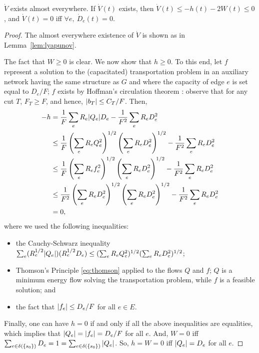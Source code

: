 \documentclass[11pt,a4paper]{article}
\begin{document}
\begin{lemma}
\label{lem:lyapunov transportation}
$\dot{V}$ exists almost everywhere. 
If $\dot{V}(t)$ exists, then $\dot{V}(t) \le -h(t) -2W(t) \le 0$, and
$\dot{V}(t)=0$ iff $\forall e,~\dot{D}_e(t)=0$.  
\end{lemma}
\begin{proof} The almost everywhere existence of $\dot{V}$ is shown as in
Lemma~\ref{lem:lyapunov}. 
 

The fact that $W \ge 0$ is clear. We now show that $h \ge 0$. To this end, let
$f$ represent a solution to the (capacitated) transportation problem in an auxiliary network
having the same structure as $G$ and where the capacity of edge $e$ is set equal to
$D_e/F$; $f$ exists by Hoffman's circulation theorem \cite[Corollary 11.2g]{Schrijver:2003}: observe that for any cut $T$, $F_T \ge F$, and hence, $| b_T | \le C_T/F$. 
Then, 
\begin{align*}
-h &= \frac{1}{F} \sum_e R_e | Q_e | D_e  - \frac{1}{F^2} \sum_{e} R_{e} D_{e}^2 \\
&\le \frac{1}{F} \left(\sum_e R_e Q_e^2 \right)^{1/2} \left( \sum_e R_e D_e^2 \right)^{1/2} - \frac{1}{F^2} \sum_e R_e D_e^2 \\
&\le \frac{1}{F} \left( \sum_e R_e {f_e^2} \right)^{1/2} \left( \sum_e R_e D_e^2 \right)^{1/2} - \frac{1}{F^2} \sum_e R_e D_e^2 \\
&\le \frac{1}{F^2} \left( \sum_e R_e D_e^2 \right)^{1/2} \left( \sum_e R_e
D_e^2 \right)^{1/2} - \frac{1}{F^2} \sum_e R_e D_e^2 \\
&= 0, 
\end{align*}
where we used the following inequalities:
\begin{itemize}
\item[-] the Cauchy-Schwarz inequality $\sum_e (R_e^{1/2} | Q_e |) (R_e^{1/2} D_e) \le (\sum_e R_e Q_e^2)^{1/2} (\sum_e R_e D_e^2)^{1/2}$;
\item[-] Thomson's Principle \eqref{eq:thomson} applied to the flows $Q$ and
$f$; $Q$ is a minimum energy flow solving the transportation problem, while $f$
is a feasible solution; and 
\item[-] the fact that $| f_e | \le D_e/F$ for all $e \in E$.  
\end{itemize}

Finally, one can have $h=0$ if and only if all the above inequalities are
equalities, which implies that $| Q_e |=| f_e |=D_e/F$ for all $e$. And,
$W=0$ iff $\sum_{e \in \delta(\{s_0\})} D_e = 1 = \sum_{e \in \delta(\{s_0\})}
| Q_e |$. So, $h=W=0$ iff $| Q_e |=D_e$ for all $e$.   
\end{proof}
\end{document}
